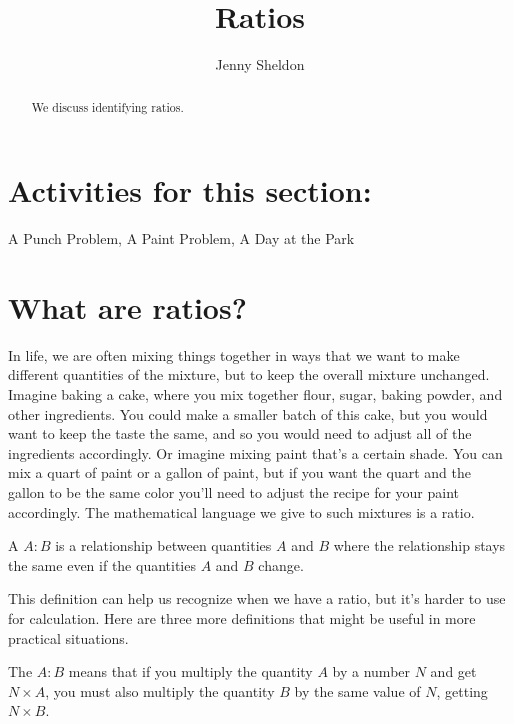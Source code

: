 \documentclass{ximera}
\title{Ratios}
\author{Jenny Sheldon}
\begin{document}
\begin{abstract}
We discuss identifying ratios.
\end{abstract}
\maketitle

\section{Activities for this section:} A Punch Problem, A Paint Problem, A Day at the Park

\section{What are ratios?}

In life, we are often mixing things together in ways that we want to make different quantities of the mixture, but to keep the overall mixture unchanged. Imagine baking a cake, where you mix together flour, sugar, baking powder, and other ingredients. You could make a smaller batch of this cake, but you would want to keep the taste the same, and so you would need to adjust all of the ingredients accordingly. Or imagine mixing paint that's a certain shade. You can mix a quart of paint or a gallon of paint, but if you want the quart and the gallon to be the same color you'll need to adjust the recipe for your paint accordingly. The mathematical language we give to such mixtures is a ratio.

\begin{definition}
A  $A:B$ is a relationship between quantities $A$ and $B$ where the relationship stays the same even if the quantities $A$ and $B$ change.
\end{definition}

This definition can help us recognize when we have a ratio, but it's harder to use for calculation. Here are three more definitions that might be useful in more practical situations. 

\begin{definition}
The  $A:B$ means that if  you multiply the quantity $A$ by a number $N$ and get $N \times A$, you must also multiply the quantity $B$ by the same value of $N$, getting $N \times B$.
\end{definition}
\end{document}
